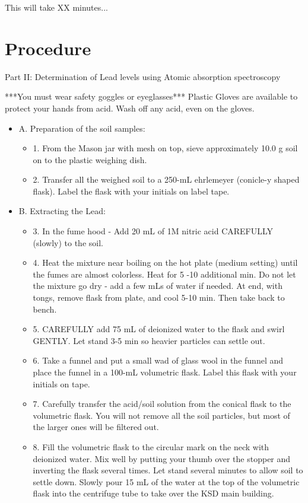 \documentclass[12pt]{../SOP2}
\begin{document}
\NP This will take XX minutes...

\section{Procedure}
\NP Part II: Determination of Lead levels using Atomic absorption spectroscopy

***You must wear safety goggles or eyeglasses***
Plastic Gloves are available to protect your hands from acid. Wash off any acid, even on the gloves.
\begin{itemize}
  \item A. Preparation of the soil samples:
  \begin{itemize}
    \item 1. From the Mason jar with mesh on top, sieve approximately 10.0 g soil on to the plastic weighing dish.
    \item 2. Transfer all the weighed soil to a 250-mL ehrlemeyer (conicle-y shaped flask). Label the flask with your initials on label tape. 
  \end{itemize}
  \item B. Extracting the Lead:
  \begin{itemize}
    \item 3. In the fume hood - Add 20 mL of 1M nitric acid CAREFULLY (slowly) to the soil.
    \item 4. Heat the mixture near boiling on the hot plate (medium setting) until the fumes are almost colorless. Heat for 5 -10 additional min. Do not let the mixture go dry - add a few mLs of water if needed. At end, with tongs, remove flask from plate, and cool 5-10 min. Then take back to bench.
    \item 5. CAREFULLY add 75 mL of deionized water to the flask and swirl GENTLY. Let stand 3-5 min so heavier particles can  settle out.
    \item 6. Take a funnel and put a small wad of glass wool in the funnel and place the funnel in a 100-mL volumetric flask.    Label this flask with your initials on tape.
    \item 7. Carefully transfer the acid/soil solution from the conical flask to the volumetric flask. You will not remove all the soil particles, but most of the larger ones will be filtered out.
    \item 8. Fill the volumetric flask to the circular mark on the neck with deionized water. Mix well by putting your thumb over the stopper and inverting the flask several times. Let stand several minutes to allow soil to settle down. Slowly pour 15 mL of the water at the top of the volumetric flask into the centrifuge tube to take over the KSD main building.

\end{itemize}
\end{itemize}
\end{document}
